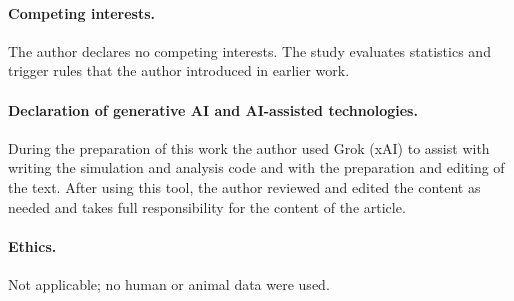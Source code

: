 \documentclass[10pt,a4paper]{article}
\begin{document}
\paragraph{Competing interests.} The author declares no competing interests. The study evaluates statistics and trigger rules that the author introduced in earlier work.
\paragraph{Declaration of generative AI and AI-assisted technologies.} During the preparation of this work the author used Grok (xAI) to assist with writing the simulation and analysis code and with the preparation and editing of the text. After using this tool, the author reviewed and edited the content as needed and takes full responsibility for the content of the article.
\paragraph{Ethics.} Not applicable; no human or animal data were used.



\end{document}
